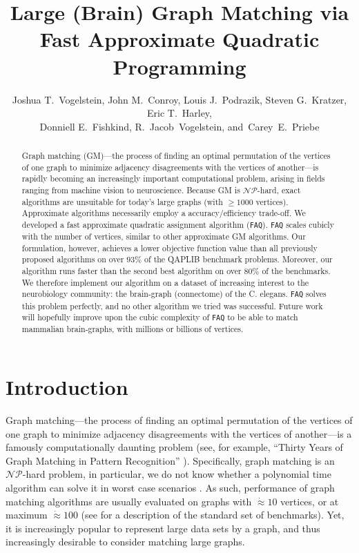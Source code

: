 \documentclass[11pt]{article}
\title{\vspace{-75pt}Large (Brain) Graph Matching via \\ Fast Approximate Quadratic Programming}
\author{Joshua T.~Vogelstein, John M.~Conroy, Louis J.~Podrazik, Steven G.~Kratzer, Eric T.~Harley, \\
        Donniell E.~Fishkind, 
		R.~Jacob~Vogelstein,
        and~Carey~E.~Priebe}
\providecommand{\mc}[1]{\mathcal{#1}}
\newcommand{\FAQ}{\texttt{FAQ} }
\begin{document}
\maketitle

 
\begin{abstract}
	
Graph matching (GM)---the process of finding an optimal permutation of the vertices of one graph to minimize adjacency disagreements with the vertices of another---is rapidly becoming an increasingly important computational problem, arising in fields ranging from machine vision to neuroscience. Because GM is $\mc{NP}$-hard, exact algorithms are unsuitable for today's large graphs (with $\ge 1000$ vertices). 
Approximate algorithms necessarily employ a accuracy/efficiency trade-off.
We developed a fast approximate quadratic assignment algorithm (\texttt{FAQ}). 
\FAQ scales cubicly with the number of vertices, similar to other approximate GM algorithms.  Our formulation, however, achieves a lower objective function value than all previously proposed algorithms on over $93\%$ of the QAPLIB benchmark problems.  Moreover, our algorithm runs faster than the second best algorithm on over $80\%$ of the benchmarks.  
We therefore implement our algorithm on a dataset of increasing interest to the neurobiology community: the brain-graph (connectome) of the C. elegans. \FAQ solves this problem perfectly, and no other algorithm we tried was successful.  
Future work will hopefully improve upon the cubic complexity of \FAQ to be able to match mammalian brain-graphs, with millions or billions of vertices.  
\end{abstract}




\section{Introduction}

Graph matching---the process of finding an optimal permutation of the vertices of one graph to minimize adjacency disagreements with the vertices of another---is a famously computationally daunting problem (see, for example, ``Thirty Years of Graph Matching in Pattern Recognition''  \cite{Conte2004}). Specifically, graph matching is an $\mc{NP}$-hard problem, in particular, we do not know whether a polynomial time algorithm can solve it in worst case scenarios \cite{Papadimitriou1998}.  
As such, performance of graph matching algorithms are usually evaluated on graphs with $\dot{\approx} 10$ vertices, or at maximum $\dot{\approx} 100$ (see \cite{Burkard1997} for a description of the standard set of benchmarks).  Yet, it is increasingly popular to represent large data sets by a graph, and thus increasingly desirable to consider matching large graphs.  
\end{document}
